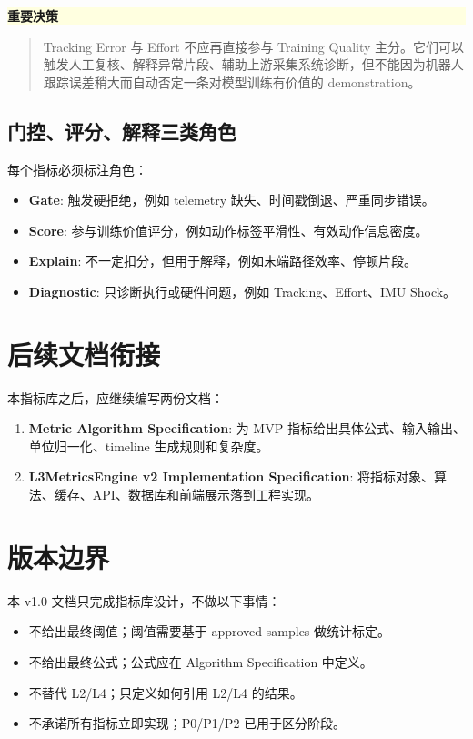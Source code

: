 \documentclass[UTF8,zihao=-4]{ctexart}
\newcommand{\Term}[1]{\textbf{#1}}
\newenvironment{warningbox}[1]{\vspace{0.5em}\noindent\colorbox{LightYellow}{\parbox{0.96\linewidth}{\textbf{#1}}}\par\vspace{-0.2em}\begin{quote}\small}{\end{quote}\vspace{0.3em}}
\begin{document}
\begin{warningbox}{重要决策}
Tracking Error 与 Effort 不应再直接参与 Training Quality 主分。它们可以触发人工复核、解释异常片段、辅助上游采集系统诊断，但不能因为机器人跟踪误差稍大而自动否定一条对模型训练有价值的 demonstration。
\end{warningbox}

\subsection{门控、评分、解释三类角色}

每个指标必须标注角色：

\begin{itemize}
  \item \Term{Gate}: 触发硬拒绝，例如 telemetry 缺失、时间戳倒退、严重同步错误。
  \item \Term{Score}: 参与训练价值评分，例如动作标签平滑性、有效动作信息密度。
  \item \Term{Explain}: 不一定扣分，但用于解释，例如末端路径效率、停顿片段。
  \item \Term{Diagnostic}: 只诊断执行或硬件问题，例如 Tracking、Effort、IMU Shock。
\end{itemize}

\section{后续文档衔接}

本指标库之后，应继续编写两份文档：

\begin{enumerate}
  \item \Term{Metric Algorithm Specification}: 为 MVP 指标给出具体公式、输入输出、单位归一化、timeline 生成规则和复杂度。
  \item \Term{L3MetricsEngine v2 Implementation Specification}: 将指标对象、算法、缓存、API、数据库和前端展示落到工程实现。
\end{enumerate}

\section{版本边界}

本 v1.0 文档只完成指标库设计，不做以下事情：

\begin{itemize}
  \item 不给出最终阈值；阈值需要基于 approved samples 做统计标定。
  \item 不给出最终公式；公式应在 Algorithm Specification 中定义。
  \item 不替代 L2/L4；只定义如何引用 L2/L4 的结果。
  \item 不承诺所有指标立即实现；P0/P1/P2 已用于区分阶段。
\end{itemize}
\end{document}
